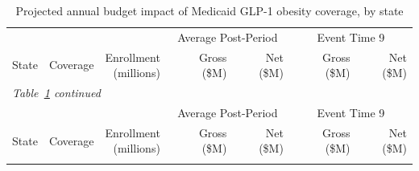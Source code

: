 \begin{landscape}
\pagestyle{lscaped}
\begin{longtable}{@{} l l r r r r r @{}}
\caption{Projected annual budget impact of Medicaid GLP-1 obesity coverage, by state}
\label{tab:budget_impact} \\
\toprule
 & & & \multicolumn{2}{c}{Average Post-Period} & \multicolumn{2}{c}{Event Time 9} \\
\cmidrule(lr){4-5} \cmidrule(lr){6-7}
State & Coverage & \shortstack{Enrollment\\(millions)} & \shortstack{Gross\\(\$M)} & \shortstack{Net\\(\$M)} & \shortstack{Gross\\(\$M)} & \shortstack{Net\\(\$M)} \\
\midrule
\endfirsthead

\multicolumn{7}{l}{\small\itshape Table~\ref{tab:budget_impact} continued} \\[3pt]
\toprule
 & & & \multicolumn{2}{c}{Average Post-Period} & \multicolumn{2}{c}{Event Time 9} \\
\cmidrule(lr){4-5} \cmidrule(lr){6-7}
State & Coverage & \shortstack{Enrollment\\(millions)} & \shortstack{Gross\\(\$M)} & \shortstack{Net\\(\$M)} & \shortstack{Gross\\(\$M)} & \shortstack{Net\\(\$M)} \\
\midrule
\endhead

\bottomrule
\endlastfoot


\end{longtable}
\end{landscape}

